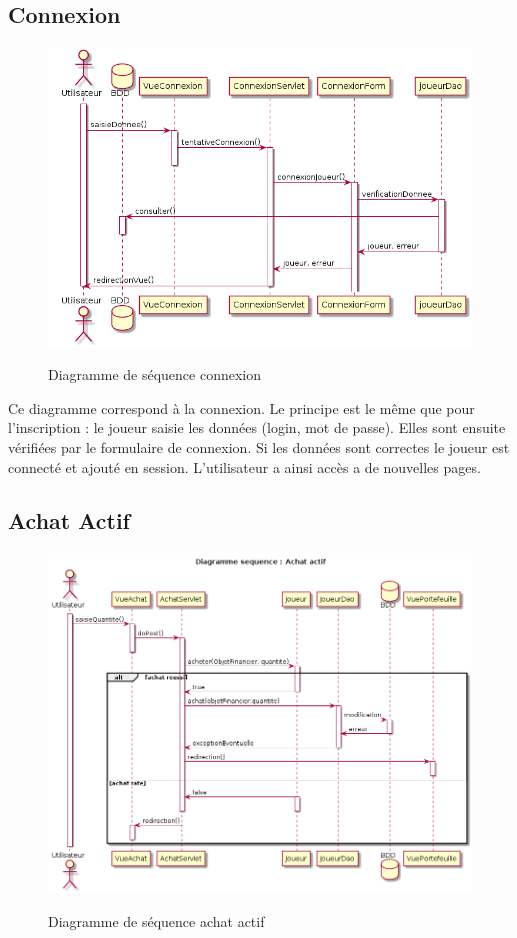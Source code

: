 \subsection{Connexion}
\begin{figure}[H]
  \center
  \includegraphics[scale=0.35]{../graph/DiagrammeSequenceConnexion.png} \\
  \caption{Diagramme de séquence connexion}
\end{figure}

Ce diagramme correspond à la connexion. Le principe est le même que pour l'inscription : le joueur saisie les données (login, mot de passe). Elles sont ensuite vérifiées par le formulaire de connexion. Si les données sont correctes le joueur est connecté et ajouté en session. L'utilisateur a ainsi accès a de nouvelles pages.

\subsection{Achat Actif}
\begin{figure}[H]
  \center
  \includegraphics[scale=0.35]{../graph/DiagrammeSequenceAchatActif.png} \\
  \caption{Diagramme de séquence achat actif}
\end{figure}

